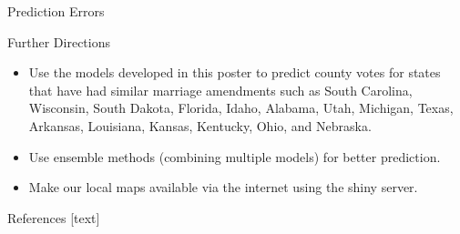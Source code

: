 \documentclass[final]{beamer}\usepackage[]{graphicx}\usepackage[]{color}
\begin{document}
\begin{frame}[fragile]
\begin{columns}[t]
\begin{column}{0.31\linewidth}
\begin{minipage}[t][.955\textheight]{\linewidth}
\begin{block}{Prediction Errors}
\vspace{0ex}
\vfill
\end{block}
\vfill

\begin{block}{Further Directions}
\begin{itemize}
\item Use the models developed in this poster to predict county votes for states that have had similar marriage amendments such as South Carolina, Wisconsin, South Dakota, Florida, Idaho, Alabama, Utah, Michigan, Texas, Arkansas, Louisiana, Kansas, Kentucky, Ohio, and Nebraska. 
\item  Use ensemble methods (combining multiple models) for better prediction.
\item  Make our local maps available via the internet using the shiny server.
\end{itemize}
\vspace{0ex}
\vfill
\end{block}
\vfill

\begin{block}{References}
\footnotesize
{}[text]
\vspace{-1ex}



\normalsize
\vfill
\end{block} 
\vfill

\end{minipage}
\end{column}%




\end{columns}
\end{frame}
\end{document}
